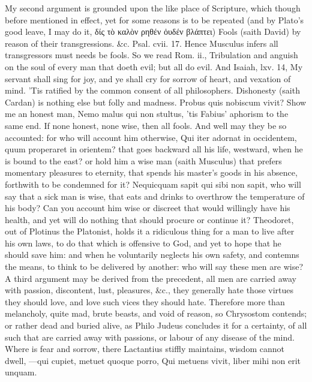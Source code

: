 {My second argument is grounded upon the like place of Scripture, which
though before mentioned in effect, yet for some reasons is to be
repeated (and by Plato's good leave, I may do it, δίς τὸ καλὸν
ρηθέν ὀυδέν βλάπτει) Fools (saith David) by reason of their
transgressions. \&c. Psal. cvii. 17. Hence Musculus infers all
transgressors must needs be fools. So we read Rom. ii., Tribulation and
anguish on the soul of every man that doeth evil; but all do evil. And
Isaiah, lxv. 14, My servant shall sing for joy, and ye shall cry
for sorrow of heart, and vexation of mind. 'Tis ratified by the common
consent of all philosophers. Dishonesty (saith Cardan) is nothing else
but folly and madness.  Probus quis nobiscum vivit? Show me an
honest man, Nemo malus qui non stultus, 'tis Fabius' aphorism to the
same end. If none honest, none wise, then all fools. And well may they
be so accounted: for who will account him otherwise, Qui iter adornat
in occidentem, quum properaret in orientem? that goes backward all his
life, westward, when he is bound to the east? or hold him a wise man
(saith Musculus) that prefers momentary pleasures to eternity,
that spends his master's goods in his absence, forthwith to be
condemned for it? Nequicquam sapit qui sibi non sapit, who will say
that a sick man is wise, that eats and drinks to overthrow the
temperature of his body? Can you account him wise or discreet that
would willingly have his health, and yet will do nothing that should
procure or continue it? Theodoret, out of Plotinus the Platonist,
holds it a ridiculous thing for a man to live after his own laws, to do
that which is offensive to God, and yet to hope that he should save
him: and when he voluntarily neglects his own safety, and contemns the
means, to think to be delivered by another: who will say these men are
wise?
A third argument may be derived from the precedent, all men are
carried away with passion, discontent, lust, pleasures, \&c., they
generally hate those virtues they should love, and love such vices they
should hate. Therefore more than melancholy, quite mad, brute beasts,
and void of reason, so Chrysostom contends; or rather dead and buried
alive, as  Philo Judeus concludes it for a certainty, of all such
that are carried away with passions, or labour of any disease of the
mind. Where is fear and sorrow, there Lactantius stiffly
maintains, wisdom cannot dwell,
---qui cupiet, metuet quoque porro,
Qui metuens vivit, liber mihi non erit unquam.

}
